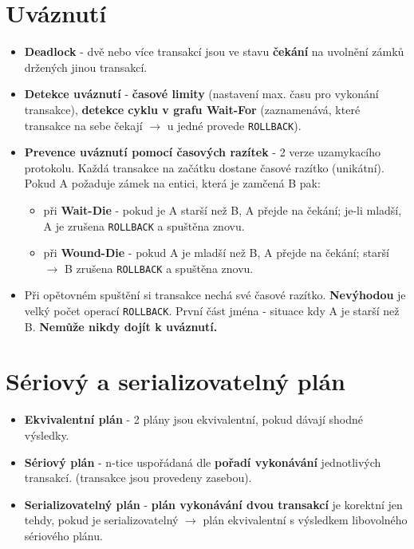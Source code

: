 \section{Uváznutí}
\begin{itemize}
    \item \textbf{Deadlock} - dvě nebo více transakcí jsou ve stavu \textbf{čekání} na uvolnění zámků držených jinou transakcí.
    \item \textbf{Detekce uváznutí} - \textbf{časové limity} (nastavení max. času pro vykonání transakce), \textbf{detekce cyklu v grafu Wait-For} (zaznamenává, které transakce na sebe čekají $\rightarrow$ u jedné provede \texttt{ROLLBACK}).
    \item \textbf{Prevence uváznutí pomocí časových razítek} - 2 verze uzamykacího protokolu. Každá transakce na začátku dostane časové razítko (unikátní). Pokud A požaduje zámek na entici, která je zamčená B pak:
          \begin{itemize}
              \item při \textbf{Wait-Die} - pokud je A starší než B, A přejde na čekání; je-li mladší, A je zrušena \texttt{ROLLBACK} a spuštěna znovu.
              \item při \textbf{Wound-Die} - pokud A je mladší než B, A přejde na čekání; starší $\rightarrow$ B zrušena \texttt{ROLLBACK} a spuštěna znovu.
          \end{itemize}
    \item Při opětovném spuštění si transakce nechá své časové razítko. \textbf{Nevýhodou} je velký počet operací \texttt{ROLLBACK}. První část jména - situace kdy A je starší než B. \textbf{Nemůže nikdy dojít k uváznutí.}
\end{itemize}

\section{Sériový a serializovatelný plán}
\begin{itemize}
    \item \textbf{Ekvivalentní plán} - 2 plány jsou ekvivalentní, pokud dávají shodné výsledky.
    \item \textbf{Sériový plán} - n-tice uspořádaná dle \textbf{pořadí vykonávání} jednotlivých transakcí. (transakce jsou provedeny zasebou).
    \item \textbf{Serializovatelný plán} - \textbf{plán vykonávání dvou transakcí} je korektní jen tehdy, pokud je serializovatelný $\rightarrow$ plán ekvivalentní s výsledkem libovolného sériového plánu.
\end{itemize}

